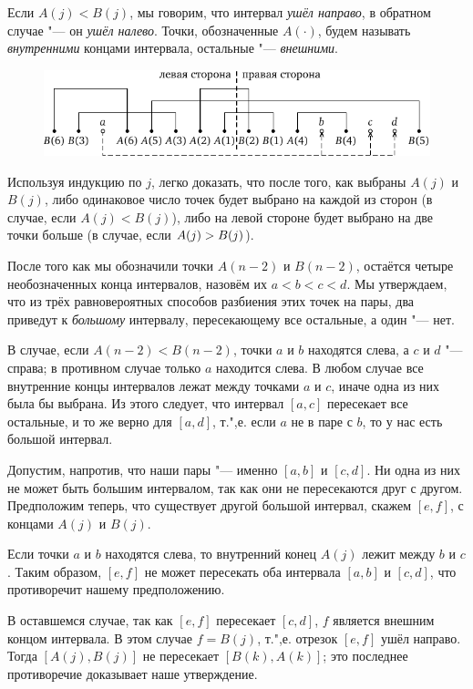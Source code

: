 \documentclass[twoside]{book}
\begin{document}
Если $A(j) < B(j)$, мы говорим, что интервал \emph{ушёл направо}, в обратном случае "--- он \emph{ушёл налево}.
Точки, обозначенные $A(\cdot )$, будем называть \emph{внутренними} концами интервала, остальные "--- \emph{внешними}.

\begin{figure}[!ht]
\centering
\includegraphics{mp/wink-5}
\end{figure} 

Используя индукцию по $j$, легко доказать, что после того, как выбраны $A(j)$ и $B(j)$, либо одинаковое число точек будет выбрано на каждой из сторон (в случае, если $A(j) < B(j)$), либо на левой стороне будет выбрано на две точки больше (в случае, если $A(j) \z> B(j)$).

После того как мы обозначили точки $A(n-2)$ и $B(n-2)$, остаётся четыре необозначенных конца интервалов, назовём их $a<b<c<d$.
Мы утверждаем, что из трёх равновероятных способов разбиения этих точек на пары, два приведут к \emph{большому} интервалу, пересекающему все остальные, а один "--- нет.

В случае, если $A(n-2) < B(n-2)$, точки $a$ и $b$ находятся слева, а $c$ и $d$ "--- справа;
в противном случае только $a$ находится слева.
В любом случае все внутренние концы интервалов лежат между точками $a$ и $c$, иначе одна из них была бы выбрана.
Из этого следует, что интервал $[a,c]$ пересекает все остальные, и то же верно для $[a,d]$, т.",е. если $a$ не в паре с $b$, то у нас есть большой интервал.

Допустим, напротив, что наши пары "--- именно $[a, b]$ и $[c, d]$.
Ни одна из них не может быть большим интервалом, так как они не пересекаются друг с другом.
Предположим теперь, что существует другой большой интервал, скажем $[e,f]$, с концами $A(j)$ и $B(j)$.

Если точки $a$ и $b$ находятся слева, то внутренний конец $A(j)$ лежит между $b$ и $c$.
Таким образом, $[e, f]$ не может пересекать оба интервала $[a, b]$ и $[c, d]$, что противоречит нашему предположению.

В оставшемся случае, так как $[e, f]$ пересекает $[c, d]$, $f$ является внешним концом интервала. 
В этом случае $f=B(j)$, т.",е. отрезок $[e, f]$ ушёл направо.
Тогда $[A(j), B(j)]$ не пересекает $[B(k), A(k)]$; это последнее противоречие доказывает наше утверждение.
\heart
\end{document}
